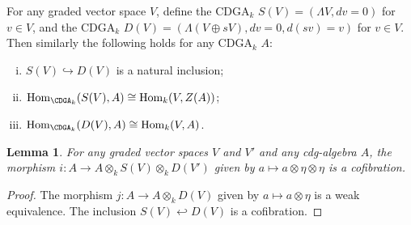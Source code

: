 \documentclass[psamsfonts]{amsart}
\newtheorem{lem}{Lemma}[section]
\theoremstyle{definition}
\newcommand{\Hom}{\mathrm{Hom}}
\numberwithin{equation}{section}
\begin{document}
For any graded vector space $V$, define the CDGA$_k$ $S(V)=(\Lambda V,dv=0)$ for $v\in V$, and the CDGA$_k$ $D(V)=(\Lambda(V\oplus sV),dv=0,d(sv)=v)$ for $v\in V$. Then similarly the following holds for any CDGA$_k$ $A$:\begin{enumerate}[(i)]
    \item $S(V)\hookrightarrow D(V)$ is a natural inclusion;
    \item $\Hom_{\CDGA_k}(S(V),A)\cong\Hom_k(V,Z(A))$;
    \item $\Hom_{\CDGA_k}(D(V),A)\cong\Hom_k(V,A)$.
\end{enumerate}

\begin{lem}
For any graded vector spaces $V$ and $V'$ and any cdg-algebra $A$, the morphism $i:A\to A\otimes_kS(V)\otimes_kD(V')$ given by $a\mapsto a\otimes\eta\otimes\eta$ is a cofibration.
\end{lem}
\begin{proof}
The morphism $j:A\to A\otimes_kD(V)$ given by $a\mapsto a\otimes\eta$ is a weak equivalence. The inclusion $S(V)\hookleftarrow D(V)$ is a cofibration.
\end{proof}
\end{document}
